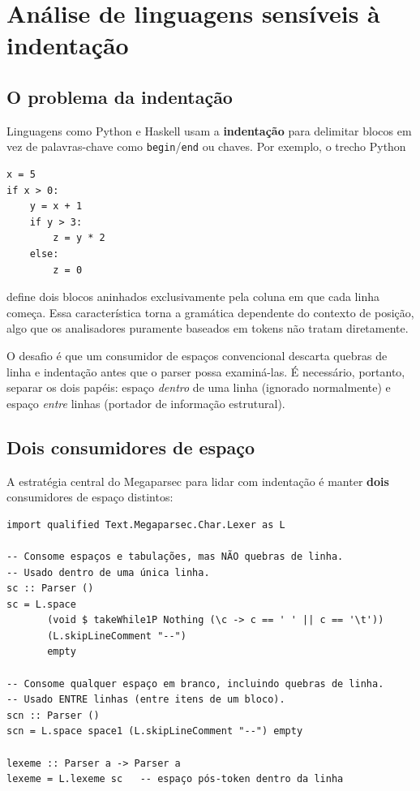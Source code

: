 \section{Análise de linguagens sensíveis à indentação}

\subsection{O problema da indentação}

Linguagens como Python e Haskell usam a \textbf{indentação} para
delimitar blocos em vez de palavras-chave como \texttt{begin}/\texttt{end}
ou chaves. Por exemplo, o trecho Python

\begin{verbatim}
x = 5
if x > 0:
    y = x + 1
    if y > 3:
        z = y * 2
    else:
        z = 0
\end{verbatim}

\noindent define dois blocos aninhados exclusivamente pela coluna em que cada
linha começa. Essa característica torna a gramática dependente do
contexto de posição, algo que os analisadores puramente baseados em
tokens não tratam diretamente.

O desafio é que um consumidor de espaços convencional descarta
quebras de linha e indentação antes que o parser possa examiná-las.
É necessário, portanto, separar os dois papéis: espaço \emph{dentro}
de uma linha (ignorado normalmente) e espaço \emph{entre} linhas
(portador de informação estrutural).

\subsection{Dois consumidores de espaço}

A estratégia central do Megaparsec para lidar com indentação é manter
\textbf{dois} consumidores de espaço distintos:

\begin{verbatim}
import qualified Text.Megaparsec.Char.Lexer as L

-- Consome espaços e tabulações, mas NÃO quebras de linha.
-- Usado dentro de uma única linha.
sc :: Parser ()
sc = L.space
       (void $ takeWhile1P Nothing (\c -> c == ' ' || c == '\t'))
       (L.skipLineComment "--")
       empty

-- Consome qualquer espaço em branco, incluindo quebras de linha.
-- Usado ENTRE linhas (entre itens de um bloco).
scn :: Parser ()
scn = L.space space1 (L.skipLineComment "--") empty

lexeme :: Parser a -> Parser a
lexeme = L.lexeme sc   -- espaço pós-token dentro da linha
\end{verbatim}

